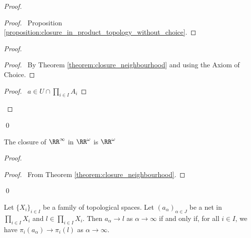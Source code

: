 \begin{proof}
    \pf
    \begin{proof}
        \pf\ Proposition \ref{proposition:closure_in_product_topology_without_choice}.
    \end{proof}
    \begin{proof}
        \begin{proof}
            \pf\ By Theorem \ref{theorem:closure_neighbourhood} and  using the Axiom of Choice.
        \end{proof}
        \qedstep
        \begin{proof}
            \pf\ $a \in U \cap \prod_{i \in I} A_i$
        \end{proof}
    \end{proof}
    \qed
\end{proof}

\begin{example}
    The closure of $\RR^\infty$ in $\RR^\omega$ is $\RR^\omega$
\end{example}

\begin{proof}
    \pf
    \qedstep
    \begin{proof}
        \pf\ From Theorem \ref{theorem:closure_neighbourhood}.
    \end{proof}
    \qed
\end{proof}

\begin{proposition}
    \label{proposition:converge_product}
    Let $\{ X_i \}_{i \in I}$ be a family of topological spaces. Let $(a_\alpha)_{\alpha \in J}$ be a net in $\prod_{i \in I} X_i$ and $l \in \prod_{i \in I} X_i$.
    Then $a_\alpha \rightarrow l$ as $\alpha \rightarrow \infty$ if and only if, for all $i \in I$, we have $\pi_i(a_\alpha) \rightarrow \pi_i(l)$ as $\alpha \rightarrow \infty$.
\end{proposition}

